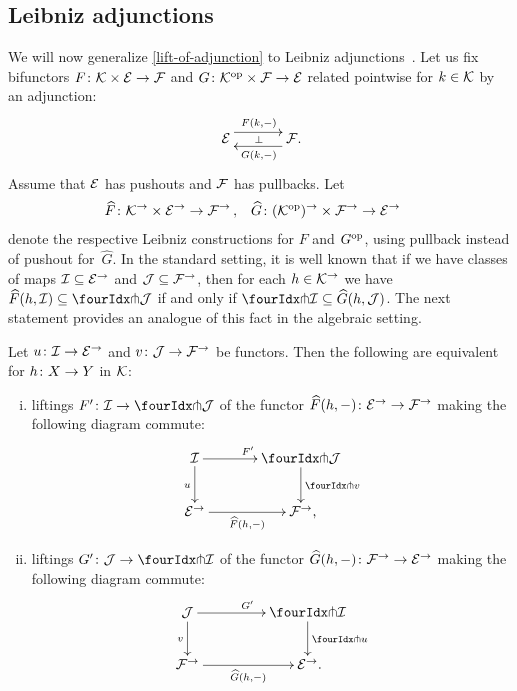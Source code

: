 \documentclass[reqno,10pt,a4paper,oneside,draft]{amsart}
\begin{document}
\subsection*{Leibniz adjunctions}

We will now generalize \cref{lift-of-adjunction} to Leibniz adjunctions~\cite{riehl-verity:reedy}.
Let us fix bifunctors $F \co \cal{K} \times \catE \to \cal{F}$ and $G \co \cal{K}^{\op} \times \cal{F} \to \catE$ related pointwise for $k \in \cal{K}$ by an adjunction:
\[
\xymatrix@C+1em{
  \catE
  \ar@<5pt>[r]^{F(k, \arghole)}
  \ar@{}[r]|{\bot}
&
  \cal{F}
  \ar@<5pt>[l]^{G(k, \arghole)}
\rlap{.}}
\]
Assume that $\catE$ has pushouts and $\cal{F}$ has pullbacks.
Let
\[
\begin{aligned}
  \widehat{F} &\co \cal{K}^\to \times \catE^\to \to \cal{F}^\to
\, ,&
  \widehat{G} &\co (\cal{K}^{\op})^\to \times \cal{F}^\to \to \catE^\to
\end{aligned}
\]
denote the respective Leibniz constructions for $F$ and $G^{\op}$, using pullback instead of pushout for~$\widehat{G}$.
In the standard setting, it is well known that if we have classes of maps $\cal{I} \subseteq \catE^\to$ and $\cal{J} \subseteq \cal{F}^\to$, then for each $h \in \cal{K}^\to$ we have $\widehat{F}(h, \cal{I}) \subseteq \liftl{\cal{J}}$ if and only if $\liftr{\cal{I}} \subseteq \widehat{G}(h, \cal{J})$.
The next statement provides an analogue of this fact in the algebraic setting.

\begin{proposition} \label{lift-of-leibniz-adjunction}
Let $u \co \cal{I} \to \catE^\to$ and $v \co \cal{J} \to \cal{F}^\to$ be functors.
Then the following are equivalent for $h \co X \to Y$ in $\cal{K}$:
\begin{enumerate}[(i)]
\item liftings $F' \co \cal{I} \to \liftl{\cal{J}}$ of the functor $\widehat{F}(h, \arghole) \co \catE^\to \to \cal{F}^\to$ making the following diagram commute:
\[
\xymatrix@C=1.2cm{
  \cal{I}
  \ar[r]^{F'}
  \ar[d]_{u}
&
  \liftl{\cal{J}}
  \ar[d]^{\liftl{v}}
\\
  \catE^\to
  \ar[r]_-{\widehat{F}(h, \arghole)}
&
  \cal{F}^\to
\rlap{,}}
\]
\item liftings $G' \co \cal{J} \to \liftr{\cal{I}}$ of the functor $\widehat{G}(h, \arghole) \co \cal{F}^\to \to \catE^\to$ making the following diagram commute:
\[
\xymatrix@C+2em{
  \cal{J}
  \ar[d]_{v}
  \ar[r]^{G'}
&
  \liftr{\cal{I}}
  \ar[d]^{\liftr{u}}
\\
  \cal{F}^\to
  \ar[r]_-{\widehat{G}(h, \arghole)}
&
  \catE^\to
\rlap{.}}
\]
\end{enumerate}
\end{proposition}
\end{document}
